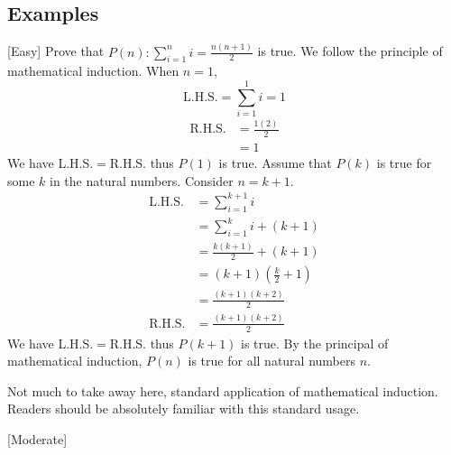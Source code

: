 \documentclass[a4paper]{article}
\begin{document}
\subsection{Examples}
\begin{eg}{}{}[Easy] Prove that $P(n):\sum_{i=1}^{n}i=\frac{n(n+1)}{2}$ is true. \linebreak\linebreak
We follow the principle of mathematical induction. When $n=1$, $$\text{L.H.S.}=\sum_{i=1}^1i=1$$ \begin{align*}
\text{R.H.S.}&=\frac{1(2)}{2}\\
&=1
\end{align*} We have L.H.S.$=$R.H.S. thus $P(1)$ is true. \linebreak\linebreak
Assume that $P(k)$ is true for some $k$ in the natural numbers. Consider $n=k+1$. 
\begin{align*}
\text{L.H.S.}&=\sum_{i=1}^{k+1}i\\
&=\sum_{i=1}^ki+(k+1)\\
&=\frac{k(k+1)}{2}+(k+1)\tag{By assumption}\\
&=(k+1)\left(\frac{k}{2}+1\right)\\
&=\frac{(k+1)(k+2)}{2}\\
\text{R.H.S.}&=\frac{(k+1)(k+2)}{2}
\end{align*} We have L.H.S.$=$R.H.S. thus $P(k+1)$ is true. By the principal of mathematical induction, $P(n)$ is true for all natural numbers $n$. 
\end{eg}
Not much to take away here, standard application of mathematical induction. Readers should be absolutely familiar with this standard usage. 

\begin{eg}{}{}[Moderate]
\end{eg}
\end{document}
